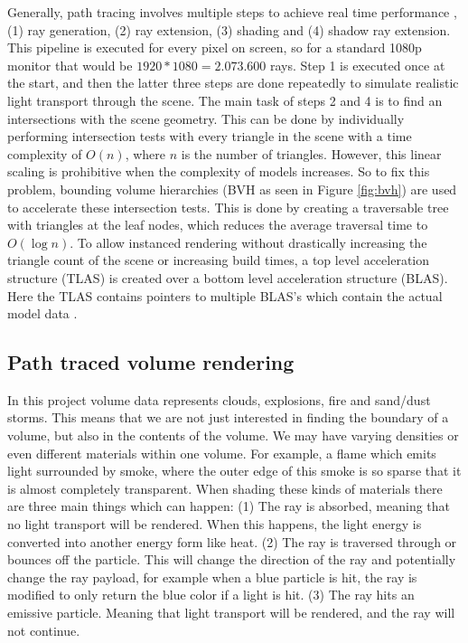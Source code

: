 Generally, path tracing involves multiple steps to achieve real time performance \cite{laine2013megakernels}, (1) ray generation, (2) ray extension, (3) shading and (4) shadow ray extension. This pipeline is executed for every pixel on screen, so for a standard 1080p monitor that would be $1920*1080=2.073.600$ rays. Step 1 is executed once at the start, and then the latter three steps are done repeatedly to simulate realistic light transport through the scene. The main task of steps 2 and 4 is to find an intersections with the scene geometry. This can be done by individually performing intersection tests with every triangle in the scene with a time complexity of $O(n)$, where $n$ is the number of triangles. However, this linear scaling is prohibitive when the complexity of models increases. So to fix this problem, bounding volume hierarchies (BVH as seen in Figure \ref{fig:bvh}) are used to accelerate these intersection tests. This is done by creating a traversable tree with triangles at the leaf nodes, which reduces the average traversal time to  $O(\log n)$. To allow instanced rendering without drastically increasing the triangle count of the scene or increasing build times, a top level acceleration structure (TLAS) is created over a bottom level acceleration structure (BLAS). Here the TLAS contains pointers to multiple BLAS's which contain the actual model data \cite{VulkanAccelerationStructures}.



\clearpage\subsection{Path traced volume rendering} \label{introduction:path_traced_volume_rendering}
In this project volume data represents clouds, explosions, fire and sand/dust storms. This means that we are not just interested in finding the boundary of a volume, but also in the contents of the volume. We may have varying densities or even different materials within one volume. For example, a flame which emits light surrounded by smoke, where the outer edge of this smoke is so sparse that it is almost completely transparent. When shading these kinds of materials there are three main things which can happen: (1) The ray is absorbed, meaning that no light transport will be rendered. When this happens, the light energy is converted into another energy form like heat. (2) The ray is traversed through or bounces off the particle. This will change the direction of the ray and potentially change the ray payload, for example when a blue particle is hit, the ray is modified to only return the blue color if a light is hit. (3) The ray hits an emissive particle. Meaning that light transport will be rendered, and the ray will not continue.

